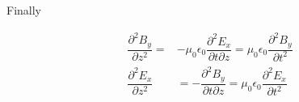 \documentclass{article}
\begin{document}
Finally

\begin{equation*}
  \begin{aligned}
    \dfrac{\partial^{2} B_{y}}{\partial z^{2}} =& - \mu_0 \epsilon_0 \dfrac{\partial^{2} E_{x}}{\partial t \partial z} = \mu_0 \epsilon_0 \dfrac{\partial^{2} B_{y}}{\partial t^{2}}\\
    \dfrac{\partial^2 E_x}{\partial z^2} &= - \dfrac{\partial^2 B_y}{\partial t \partial z} =   \mu_0 \epsilon_0 \dfrac{\partial^2 E_x}{\partial t^2} 
  \end{aligned}
\end{equation*}
\end{document}
